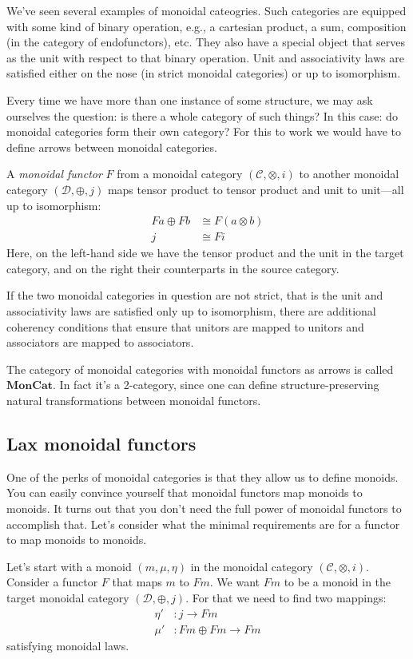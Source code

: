 \documentclass[DaoFP]{subfiles}
\begin{document}
We've seen several examples of monoidal cateogries. Such categories are equipped with some kind of binary operation, e.g., a cartesian product, a sum, composition (in the category of endofunctors), etc. They also have a special object that serves as the unit with respect to that binary operation. Unit and associativity laws are satisfied either on the nose (in strict monoidal categories) or up to isomorphism.

Every time we have more than one instance of some structure, we may ask ourselves the question: is there a whole category of such things? In this case: do monoidal categories form their own category? For this to work we would have to define arrows between monoidal categories.

A \emph{monoidal functor} $F$ from a monoidal category $(\mathcal{C}, \otimes, i)$ to another monoidal category $(\mathcal{D}, \oplus, j)$ maps tensor product to tensor product and unit to unit---all up to isomorphism:
\begin{align*}
F a \oplus F b &\cong F (a \otimes b) \\
j &\cong F i
\end{align*}
Here, on the left-hand side we have the tensor product and the unit in the target category, and on the right their counterparts in the source category.

If the two monoidal categories in question are not strict, that is the unit and associativity laws are satisfied only up to isomorphism, there are additional coherency conditions that ensure that unitors are mapped to unitors and associators are mapped to associators.

The category of monoidal categories with monoidal functors as arrows is called $\mathbf{MonCat}$. In fact it's a 2-category, since one can define structure-preserving natural transformations between monoidal functors.

\subsection{Lax monoidal functors}

One of the perks of monoidal categories is that they allow us to define monoids. You can easily convince yourself that monoidal functors map monoids to monoids. It turns out that you don't need the full power of monoidal functors to accomplish that. Let's consider what the minimal requirements are  for a functor to map monoids to monoids.

Let's start with a monoid $(m, \mu, \eta)$ in the monoidal category $(\mathcal{C}, \otimes, i)$. Consider a functor $F$ that maps $m$ to $F m$. We want $F m$ to be a monoid in the target monoidal category $(\mathcal{D}, \oplus, j)$. For that we need to find two mappings:
\begin{align*}
\eta' &\colon j \to F m \\
 \mu' &\colon F m \oplus F m \to F m
\end{align*}
satisfying monoidal laws.
\end{document}
